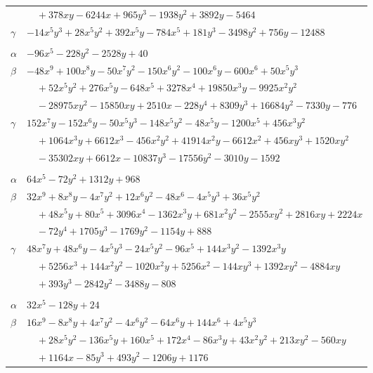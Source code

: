 \documentclass[11pt]{article}
\begin{document}
\begin{longtable}{@{}ll@{}}
 & $\quad +378xy-6244x+965y^{3}-1938y^{2}+3892y-5464$\\
$\gamma$ & $-14x^{5}y^{3}+28x^{5}y^{2}+392x^{5}y-784x^{5}+181y^{3}-3498y^{2}+756y-12488$\\
\addlinespace[3pt]
\multicolumn{2}{@{}l}{$\{i,j\}=\{6,27\}$, $k_{ij}=2^{3}\cdot 5$}\\
$\alpha$ & $-96x^{5}-228y^{2}-2528y+40$\\
$\beta$ & $-48x^{9}+100x^{8}y-50x^{7}y^{2}-150x^{6}y^{2}-100x^{6}y-600x^{6}+50x^{5}y^{3}$\\
 & $\quad +52x^{5}y^{2}+276x^{5}y-648x^{5}+3278x^{4}+19850x^{3}y-9925x^{2}y^{2}$\\
 & $\quad -28975xy^{2}-15850xy+2510x-228y^{4}+8309y^{3}+16684y^{2}-7330y-776$\\
$\gamma$ & $152x^{7}y-152x^{6}y-50x^{5}y^{3}-148x^{5}y^{2}-48x^{5}y-1200x^{5}+456x^{3}y^{2}$\\
 & $\quad +1064x^{3}y+6612x^{3}-456x^{2}y^{2}+41914x^{2}y-6612x^{2}+456xy^{3}+1520xy^{2}$\\
 & $\quad -35302xy+6612x-10837y^{3}-17556y^{2}-3010y-1592$\\
\addlinespace[3pt]
\multicolumn{2}{@{}l}{$\{i,j\}=\{6,30\}$, $k_{ij}=2^{5}\cdot 5$}\\
$\alpha$ & $64x^{5}-72y^{2}+1312y+968$\\
$\beta$ & $32x^{9}+8x^{8}y-4x^{7}y^{2}+12x^{6}y^{2}-48x^{6}-4x^{5}y^{3}+36x^{5}y^{2}$\\
 & $\quad +48x^{5}y+80x^{5}+3096x^{4}-1362x^{3}y+681x^{2}y^{2}-2555xy^{2}+2816xy+2224x$\\
 & $\quad -72y^{4}+1705y^{3}-1769y^{2}-1154y+888$\\
$\gamma$ & $48x^{7}y+48x^{6}y-4x^{5}y^{3}-24x^{5}y^{2}-96x^{5}+144x^{3}y^{2}-1392x^{3}y$\\
 & $\quad +5256x^{3}+144x^{2}y^{2}-1020x^{2}y+5256x^{2}-144xy^{3}+1392xy^{2}-4884xy$\\
 & $\quad +393y^{3}-2842y^{2}-3488y-808$\\
\addlinespace[3pt]
\multicolumn{2}{@{}l}{$\{i,j\}=\{6,33\}$, $k_{ij}=2^{4}\cdot 3\cdot 7^{2}$}\\
$\alpha$ & $32x^{5}-128y+24$\\
$\beta$ & $16x^{9}-8x^{8}y+4x^{7}y^{2}-4x^{6}y^{2}-64x^{6}y+144x^{6}+4x^{5}y^{3}$\\
 & $\quad +28x^{5}y^{2}-136x^{5}y+160x^{5}+172x^{4}-86x^{3}y+43x^{2}y^{2}+213xy^{2}-560xy$\\
 & $\quad +1164x-85y^{3}+493y^{2}-1206y+1176$\\

\end{longtable}
\end{document}
